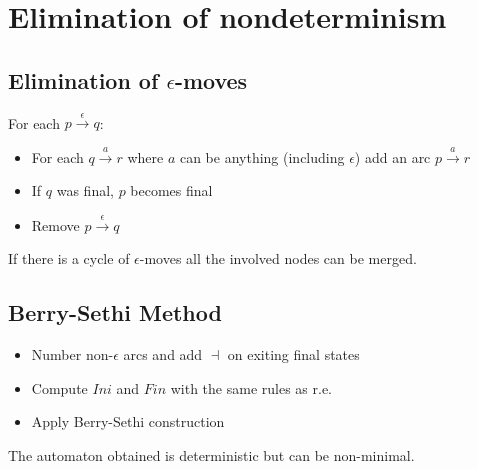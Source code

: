 \section{Elimination of nondeterminism}

\subsection{Elimination of $\epsilon$-moves}
For each $p \xrightarrow{\epsilon} q$:
\begin{itemize}
    \item For each $q \xrightarrow{a} r$ where $a$ can be anything (including $\epsilon$) add an arc $p \xrightarrow{a} r$
    \item If $q$ was final, $p$ becomes final
    \item Remove $p \xrightarrow{\epsilon} q$
\end{itemize}

If there is a cycle of $\epsilon$-moves all the involved nodes can be merged.

\subsection{Berry-Sethi Method}
\begin{itemize}
    \item Number non-$\epsilon$ arcs and add $\dashv$ on exiting final states
    \item Compute $Ini$ and $Fin$ with the same rules as r.e.
    \item Apply Berry-Sethi construction
\end{itemize}
The automaton obtained is deterministic but can be non-minimal.
